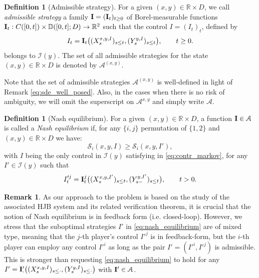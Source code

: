 \documentclass[10pt]{article}
\numberwithin{equation}{section}
\theoremstyle{plain}
\numberwithin{theorem}{section}
\theoremstyle{definition}
\newtheorem{definition}[theorem]{Definition}
\newtheorem{remark}[theorem]{Remark}
\def \R {\mathbb{R}}
\newcommand{\<}{\langle}
\renewcommand{\>}{\rangle}
\renewcommand{\(}{\left(}
\renewcommand{\)}{\right)}
\newcommand{\NCL}[1]{\mathbb{D} ([0,{#1}];D)}
\newcommand\contr{{\bf I}}
\def \R  {{\mathbb {R}}}
\def \R {{\mathbb {R}}}
\def\cS{{\mathcal S}}
\begin{document}
{\begin{definition}[Admissible strategy]\label{def:markov_strategy}
For a given $(x,y)\in \R\times D$, we call \emph{admissible strategy} a family $\contr = (\contr_t)_{t\geq 0}$ of Borel-measurable functions $\contr_t:  C([0,t])\times \NCL{t} \to \R^2$ such that the control $I = (I_t)_t$, defined by
\begin{equation}\label{eq:contr_markov}
I_t = \contr_t\big((X^{x,y,I}_s)_{s\leq t}, (Y^{y,I}_{s})_{s\leq t}\big), \qquad t\geq 0.
\end{equation}
belongs to $\mathcal{I}(y)$. The set of all admissible strategies for the state $(x,y)\in \R\times D$ is denoted by $\mathcal{A}^{(x,y)}$. %
\end{definition}
{Note that the set of admissible strategies $\mathcal{A}^{(x,y)}$ is well-defined in light of Remark \ref{eq:sde_well_posed}. Also, in the cases when there is no risk of ambiguity, we will omit the superscript on $\mathcal{A}^{x,y}$  and simply write $\mathcal{A}$. 
\begin{definition}[Nash equilibrium]\label{def:nash_equilibrium} {For a given $(x,y)\in \R\times D$, a}  function $\contr \in \mathcal{A}$ is called a \emph{Nash equilibrium} if, for any $\{i,j\}$ permutation of $\{1,2 \}$ and $(x,y)\in\R\times D$ we have:
\begin{equation}\label{eq:nash_equilibrium}
\cS_i(x,y,I)\ge \cS_i(x,y,I'), 
\end{equation}
with {$I$ being the only control in $\mathcal{I}(y)$ satisfying in \eqref{eq:contr_markov}}, for any $I'\in\mathcal{I}(y)$ such that 
\begin{equation}%
I'^j_t = \contr^{j}_t\big((X^{x,y,I'}_s)_{s\leq t}, (Y^{y,I'}_{s-})_{s\leq t}\big), \qquad t>0.
\end{equation} 
\end{definition}
{\begin{remark}
As our approach to the problem is based on the study of the associated HJB system and its related verification theorem, it is crucial that the notion of Nash equilibrium is in feedback form (i.e. closed-loop). However, we stress that the suboptimal strategies $I'$ in \eqref{eq:nash_equilibrium} are of mixed type, meaning that the $j$-th player's control $I'^j$ is in feedback-form, but the $i$-th player can employ any control $I'^i$ as long as the pair $I'=(I'^i,I'^j)$ is admissible. This is stronger than requesting \eqref{eq:nash_equilibrium} to hold for any $I' = \contr'_{\cdot}\big((X^{x,y,I}_s)_{s\leq \cdot}, (Y^{y,I}_{s})_{s\leq \cdot}\big)$ with $\contr' \in \mathcal{A}$.

\end{remark}}}}
\end{document}
